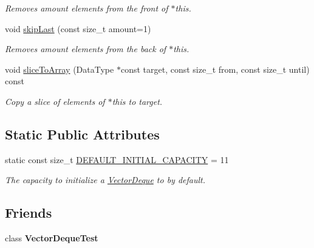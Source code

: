 \begin{DoxyCompactItemize}
\begin{DoxyCompactList}\small\item\em Removes {\ttfamily amount} elements from the front of {\ttfamily $\ast$this}. \end{DoxyCompactList}\item 
void \hyperlink{classVectorDeque_a09dc2bf1fcac2a1847de7294b45736e8}{skip\-Last} (const size\-\_\-t amount=1)
\begin{DoxyCompactList}\small\item\em Removes {\ttfamily amount} elements from the back of {\ttfamily $\ast$this}. \end{DoxyCompactList}\item 
void \hyperlink{classVectorDeque_a410696c868fd1b4adbe08875c65cf98d}{slice\-To\-Array} (Data\-Type $\ast$const target, const size\-\_\-t from, const size\-\_\-t until) const 
\begin{DoxyCompactList}\small\item\em Copy a slice of elements of {\ttfamily $\ast$this} to {\ttfamily target}. \end{DoxyCompactList}\end{DoxyCompactItemize}
\subsection*{Static Public Attributes}
\begin{DoxyCompactItemize}
\item 
\hypertarget{classVectorDeque_a932a7ea50f88f46a0d4038370685414c}{static const size\-\_\-t \hyperlink{classVectorDeque_a932a7ea50f88f46a0d4038370685414c}{D\-E\-F\-A\-U\-L\-T\-\_\-\-I\-N\-I\-T\-I\-A\-L\-\_\-\-C\-A\-P\-A\-C\-I\-T\-Y} = 11}\label{classVectorDeque_a932a7ea50f88f46a0d4038370685414c}

\begin{DoxyCompactList}\small\item\em The capacity to initialize a {\ttfamily \hyperlink{classVectorDeque}{Vector\-Deque}} to by default. \end{DoxyCompactList}\end{DoxyCompactItemize}
\subsection*{Friends}
\begin{DoxyCompactItemize}
\item 
\hypertarget{classVectorDeque_a6999d3f9756fe7f4567fe88f141d471b}{class {\bfseries Vector\-Deque\-Test}}\label{classVectorDeque_a6999d3f9756fe7f4567fe88f141d471b}

\end{DoxyCompactItemize}


